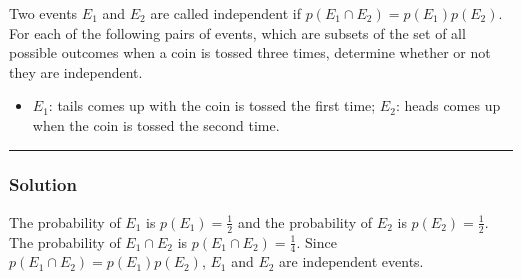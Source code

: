 \newpage
\begin{question}
Two events $E_{1}$ and $E_{2}$ are called independent if $p(E_{1} \cap E_{2}) = p(E_{1})p(E_{2})$. For each of the following pairs of events, which are subsets of the set of all possible outcomes when a coin is tossed three times, determine whether or not they are independent.

\begin{itemize}
\item $E_{1}$: tails comes up with the coin is tossed the first time; $E_{2}$: heads comes up when the coin is tossed the second time.
\end{itemize}
\end{question}

\par\noindent\rule{\textwidth}{0.5pt}

\subsubsection*{Solution}

The probability of $E_1$ is $p(E_1) = \frac{1}{2}$ and the probability of $E_2$ is $p(E_2) = \frac{1}{2}$. The probability of $E_1 \cap E_2$ is $p(E_1 \cap E_2) = \frac{1}{4}$. Since $p(E_1 \cap E_2) = p(E_1)p(E_2)$, $E_1$ and $E_2$ are independent events.